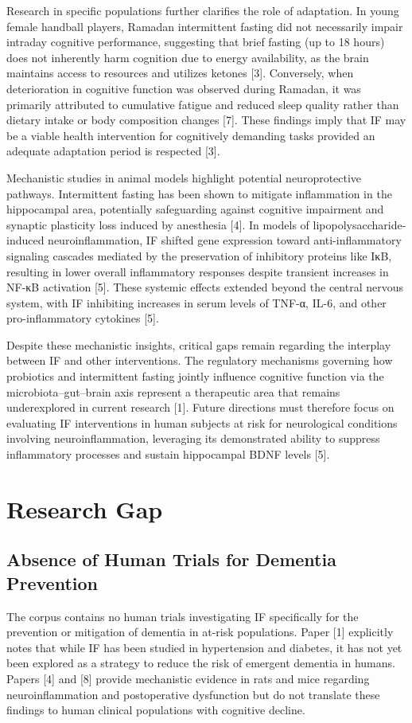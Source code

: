 \documentclass[conference]{IEEEtran}
\begin{document}
Research in specific populations further clarifies the role of adaptation. In young female handball players, Ramadan intermittent fasting did not necessarily impair intraday cognitive performance, suggesting that brief fasting (up to 18 hours) does not inherently harm cognition due to energy availability, as the brain maintains access to resources and utilizes ketones [3]. Conversely, when deterioration in cognitive function was observed during Ramadan, it was primarily attributed to cumulative fatigue and reduced sleep quality rather than dietary intake or body composition changes [7]. These findings imply that IF may be a viable health intervention for cognitively demanding tasks provided an adequate adaptation period is respected [3].

Mechanistic studies in animal models highlight potential neuroprotective pathways. Intermittent fasting has been shown to mitigate inflammation in the hippocampal area, potentially safeguarding against cognitive impairment and synaptic plasticity loss induced by anesthesia [4]. In models of lipopolysaccharide-induced neuroinflammation, IF shifted gene expression toward anti-inflammatory signaling cascades mediated by the preservation of inhibitory proteins like IκB, resulting in lower overall inflammatory responses despite transient increases in NF-κB activation [5]. These systemic effects extended beyond the central nervous system, with IF inhibiting increases in serum levels of TNF-α, IL-6, and other pro-inflammatory cytokines [5].

Despite these mechanistic insights, critical gaps remain regarding the interplay between IF and other interventions. The regulatory mechanisms governing how probiotics and intermittent fasting jointly influence cognitive function via the microbiota–gut–brain axis represent a therapeutic area that remains underexplored in current research [1]. Future directions must therefore focus on evaluating IF interventions in human subjects at risk for neurological conditions involving neuroinflammation, leveraging its demonstrated ability to suppress inflammatory processes and sustain hippocampal BDNF levels [5].

\section{Research Gap}
\subsection{Absence of Human Trials for Dementia Prevention}
The corpus contains no human trials investigating IF specifically for the prevention or mitigation of dementia in at-risk populations. Paper [1] explicitly notes that while IF has been studied in hypertension and diabetes, it has not yet been explored as a strategy to reduce the risk of emergent dementia in humans. Papers [4] and [8] provide mechanistic evidence in rats and mice regarding neuroinflammation and postoperative dysfunction but do not translate these findings to human clinical populations with cognitive decline.
\end{document}
